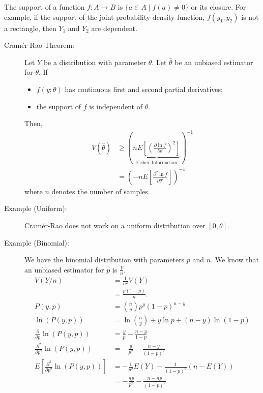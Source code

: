 \documentclass[10pt]{extarticle}
\begin{document}
  The support of a function $f: A\rightarrow B$ is $\{a\in A\mid f(a)\neq 0\}$ or its closure. For example, if the support of the joint probability density function, $f(y_1,y_2)$ is not a rectangle, then $Y_1$ and $Y_2$ are dependent.
  \begin{description}
    \item[Cramér-Rao Theorem:] Let $Y$ be a distribution with parameter $\theta$. Let $\hat{\theta}$ be an unbiased estimator for $\theta$. If
      \begin{itemize}
        \item $f(y;\theta)$ has continuous first and second partial derivatives;
        \item the support of $f$ is independent of $\theta$.
      \end{itemize}
      Then, 
      \begin{align*}
        V(\hat{\theta}) &\geq \left(\underbrace{nE\left[\left(\frac{\partial \ln f}{\partial \theta}\right)^{2}\right]}_{\text{Fisher Information}}\right)^{-1}\\
                        &= \left(-nE\left[\frac{\partial^{2} \ln f}{\partial \theta^{2}}\right]\right)^{-1}
      \end{align*}
      where $n$ denotes the number of samples.
    \item[Example (Uniform):] Cramér-Rao does not work on a uniform distribution over $[0,\theta]$. 
    \item[Example (Binomial):] We have the binomial distribution with parameters $p$ and $n$. We know that an unbiased estimator for $p$ is $\frac{Y}{n}$.
      \begin{align*}
        V(Y/n) &= \frac{1}{n^2}V(Y)\\
               &= \frac{p(1-p)}{n}.\\
        P(y,p) &= {n\choose y}p^y(1-p)^{n-y}\\
        \ln(P(y,p)) &= \ln {n\choose y} + y\ln p + (n-y) \ln(1-p)\\
        \frac{\partial}{\partial p}\ln(P(y,p)) &= \frac{y}{p} - \frac{n-y}{1-p}\\
        \frac{\partial^2}{\partial p^2} \ln(P(y,p)) &= -\frac{y}{p^2}- \frac{n-y}{(1-p)^2}\\
        E\left[\frac{\partial^2}{\partial p^2} \ln(P(y,p))\right] &= -\frac{1}{p^2}E(Y)-\frac{1}{(1-p)^2}\left(n-E(Y)\right)\\
                                                                  &= -\frac{np}{p^2} - \frac{n-np}{(1-p)^2}\\

\end{align*}
\end{description}
\end{document}
